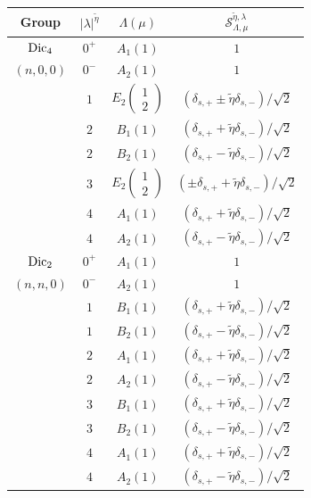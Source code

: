  
\begin{table}
\begin{centering}
\begin{tabular}{c|c|c|c}
\textbf{Group} & $|\lambda|^{\tilde{\eta}}$ & \textbf{$\Lambda(\mu)$} & \textbf{$\mathcal{S}_{\Lambda,\mu}^{\tilde{\eta},\lambda}$} \\
\hline
$\text{Dic}_{4}$ 
 & $0^+$ & $A_1(1)$ & $1$ \\
$(n,0,0)$
 & $0^-$ & $A_2(1)$ & $1$ \\
 & $1$   & $E_2\left(\begin{smallmatrix}1 \\ 2\end{smallmatrix}\right)$ & $(\delta_{s,+} \pm \tilde{\eta} \delta_{s,-})/\sqrt{2}$ \\
 & $2$   & $B_1(1)$ & $(\delta_{s,+} + \tilde{\eta} \delta_{s,-})/\sqrt{2}$ \\
 & $2$   & $B_2(1)$ & $(\delta_{s,+} - \tilde{\eta} \delta_{s,-})/\sqrt{2}$ \\
 & $3$   & $E_2\left(\begin{smallmatrix}1 \\ 2\end{smallmatrix}\right)$ & $(\pm\delta_{s,+} + \tilde{\eta} \delta_{s,-})/\sqrt{2}$ \\
 & $4$   & $A_1(1)$ & $(\delta_{s,+} + \tilde{\eta} \delta_{s,-})/\sqrt{2}$ \\
 & $4$   & $A_2(1)$ & $(\delta_{s,+} - \tilde{\eta} \delta_{s,-})/\sqrt{2}$ \\
\hline
$\text{Dic}_{2}$
 & $0^+$ & $A_1(1)$ & $1$ \\
$(n,n,0)$
 & $0^-$ & $A_2(1)$ & $1$ \\
 & $1$   & $B_1(1)$ & $(\delta_{s,+} + \tilde{\eta} \delta_{s,-})/\sqrt{2}$ \\
 & $1$   & $B_2(1)$ & $(\delta_{s,+} - \tilde{\eta} \delta_{s,-})/\sqrt{2}$ \\
 & $2$   & $A_1(1)$ & $(\delta_{s,+} + \tilde{\eta} \delta_{s,-})/\sqrt{2}$ \\
 & $2$   & $A_2(1)$ & $(\delta_{s,+} - \tilde{\eta} \delta_{s,-})/\sqrt{2}$ \\
 & $3$   & $B_1(1)$ & $(\delta_{s,+} + \tilde{\eta} \delta_{s,-})/\sqrt{2}$ \\
 & $3$   & $B_2(1)$ & $(\delta_{s,+} - \tilde{\eta} \delta_{s,-})/\sqrt{2}$ \\
 & $4$   & $A_1(1)$ & $(\delta_{s,+} + \tilde{\eta} \delta_{s,-})/\sqrt{2}$ \\
 & $4$   & $A_2(1)$ & $(\delta_{s,+} - \tilde{\eta} \delta_{s,-})/\sqrt{2}$ \\

\end{tabular}
\end{centering}
\end{table}
